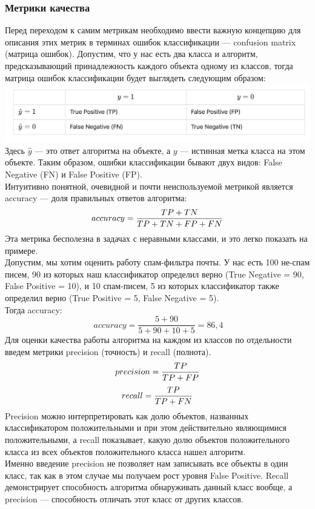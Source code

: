\documentclass[12pt, a4paper, titlepage]{extreport}
\begin{document}
	\subsubsection*{Метрики качества}
	Перед переходом к самим метрикам необходимо ввести важную концепцию для описания этих метрик в терминах ошибок классификации — confusion matrix (матрица ошибок).
	Допустим, что у нас есть два класса и алгоритм, предсказывающий принадлежность каждого объекта одному из классов, тогда матрица ошибок классификации будет выглядеть следующим образом:\\
		\includegraphics[scale=0.6]{matrix}\\
	Здесь $\hat{y}$ — это ответ алгоритма на объекте, а $y$  — истинная метка класса на этом объекте.
	Таким образом, ошибки классификации бывают двух видов: False Negative (FN) и False Positive (FP).\\
	Интуитивно понятной, очевидной и почти неиспользуемой метрикой является accuracy — доля правильных ответов алгоритма:
	$$
	\large accuracy = \frac{TP + TN}{TP + TN + FP + FN}
	$$
	Эта метрика бесполезна в задачах с неравными классами, и это легко показать на примере.\\
	Допустим, мы хотим оценить работу спам-фильтра почты. У нас есть 100 не-спам писем, 90 из которых наш классификатор определил верно (True Negative = 90, False Positive = 10), и 10 спам-писем, 5 из которых классификатор также определил верно (True Positive = 5, False Negative = 5).\\
	Тогда accuracy:\\
	$$
	\ accuracy = \frac{5 + 90}{5 + 90 + 10 + 5} = 86,4%
	$$
	Для оценки качества работы алгоритма на каждом из классов по отдельности введем метрики precision (точность) и recall (полнота).
	$$
	\large precision = \frac{TP}{TP + FP}
	$$
	$$
	\large recall = \frac{TP}{TP + FN}
	$$
	Precision можно интерпретировать как долю объектов, названных классификатором положительными и при этом действительно являющимися положительными, а recall показывает, какую долю объектов положительного класса из всех объектов положительного класса нашел алгоритм.\\
	Именно введение precision не позволяет нам записывать все объекты в один класс, так как в этом случае мы получаем рост уровня False Positive. Recall демонстрирует способность алгоритма обнаруживать данный класс вообще, а precision — способность отличать этот класс от других классов.\\
\end{document}
